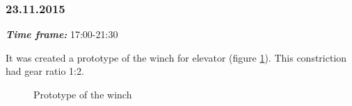 \subsubsection{23.11.2015}
\textit{\textbf{Time frame:}} 17:00-21:30

It was created a prototype of the winch for elevator (figure \ref{Winch1.1}). This constriction had gear ratio 1:2.

\begin{figure}[H]
	\begin{minipage}[h]{1\linewidth}
		\caption{Prototype of the winch}
		\label{Winch1.1}
	\end{minipage}
\end{figure}

